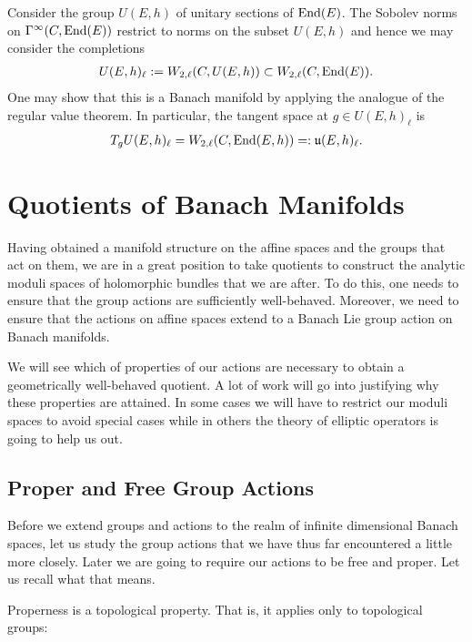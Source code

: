 \documentclass[12pt]{ociamthesis}  %
\begin{document}
\begin{example}
  Consider the group $U(E,h)$ of unitary
  sections of $\operatorname{End}(E)$. The Sobolev norms on $\Gamma^\infty(C,\operatorname{End}(E))$
  restrict to norms on the subset $U(E,h)$ and hence we
  may consider the completions
  \begin{align*}
    U(E,h)_\ell := W_{2,\ell}(C,U(E,h)) \subset W_{2,\ell}(C,\operatorname{End}(E)).
  \end{align*}
  One may show that this is a Banach manifold by applying the
  analogue of the regular value theorem. In particular,
  the tangent space at $g\in U(E,h)_\ell$ is
  \begin{align*}
    T_g U(E,h)_\ell = W_{2,\ell}(C,\operatorname{End}(E,h)) =: \mathfrak u(E,h)_\ell.
  \end{align*}
\end{example}

\section{Quotients of Banach Manifolds}

Having obtained a manifold structure on the affine spaces and the groups
that act on them, we are in a great position to take quotients to construct
the analytic moduli spaces of holomorphic bundles that we are after. To do this,
one needs to ensure that the group actions are sufficiently well-behaved. Moreover,
we need to ensure that the actions on affine spaces extend to a Banach Lie group
action on Banach manifolds.

We will see which of properties of our actions are necessary to
obtain a geometrically well-behaved quotient. A lot of work will go into justifying why
these properties are attained. In some cases we will have to
restrict our moduli spaces to avoid special cases while in others
the theory of elliptic operators is going to help us out.

\subsection{Proper and Free Group Actions}

Before we extend groups and actions to the realm of infinite dimensional
Banach spaces, let us study the group actions that we have thus
far encountered a little more closely. Later we are going to require our
actions to be free and proper. Let us recall what that means.

Properness is a topological property. That is, it applies only to
topological groups:
\end{document}
